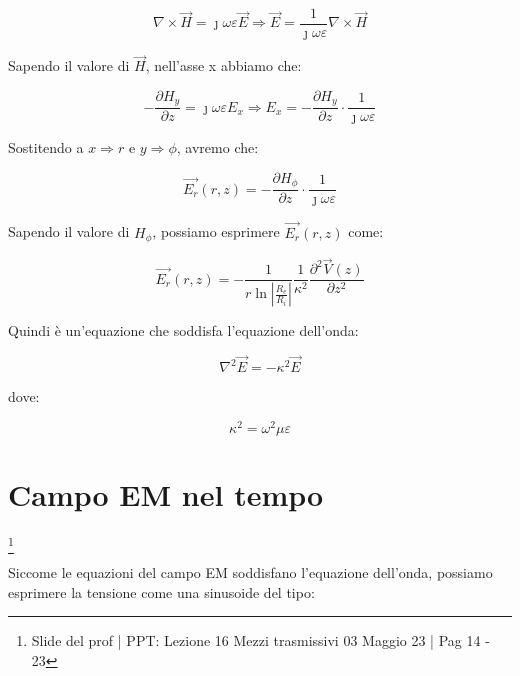 {\Large \begin{equation}
    \nabla \times \vec{H} = \jmath \omega \varepsilon \vec{E} 
    \Rightarrow \vec{E} = \frac{1}{\jmath \omega \varepsilon} \nabla \times \vec{H}
\end{equation}}

Sapendo il valore di $\vec{H}$, nell'asse x abbiamo che: 

{\Large \begin{equation}
    - \frac{\partial H_y}{\partial z} = \jmath \omega \varepsilon E_x 
    \Rightarrow E_x = - \frac{\partial H_y}{\partial z} \cdot \frac{1}{\jmath \omega \varepsilon}
\end{equation}}

Sostitendo a $x \Rightarrow r$ e $y \Rightarrow \phi$, avremo che: 

{\Large \begin{equation}
    \vec{E_r} (r, z) = - \frac{\partial H_\phi}{\partial z} \cdot \frac{1}{\jmath \omega \varepsilon}
\end{equation}}

Sapendo il valore di $H_\phi$, possiamo esprimere $\vec{E_r} (r, z)$ come: 

{\Large \begin{equation}
    \vec{E_r} (r, z) = - \frac{1}{r \ln \left|\frac{R_e}{R_i}\right|} \frac{1}{\kappa^{2}} \frac{\partial ^{2} \vec{V} (z)}{\partial  z^{2}}
\end{equation}}

Quindi è un'equazione che soddisfa l'equazione dell'onda: 

{\Large \begin{equation}
    \nabla ^{2} \vec{E} = -\kappa ^{2} \vec{E}
\end{equation}} 

dove: 

{\Large \begin{equation}
    \kappa ^{2} = \omega ^{2} \mu \varepsilon
\end{equation}} 

\newpage 

\section{Campo EM nel tempo}

\footnote{Slide del prof | PPT: Lezione 16 Mezzi trasmissivi 03 Maggio 23 | Pag 14 - 23}

Siccome le equazioni del campo EM soddisfano l'equazione dell'onda, 
possiamo esprimere la tensione come una sinusoide del tipo: 


